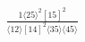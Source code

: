 \documentclass[varwidth, border=5pt]{standalone}
\begin{document}
\begin{my}
$\begin{gathered}
\scriptscriptstyle\frac{1⟨25⟩^2[15]^2}{⟨12⟩[14]^2⟨35⟩⟨45⟩}
\end{gathered}$
\end{my}
\end{document}
